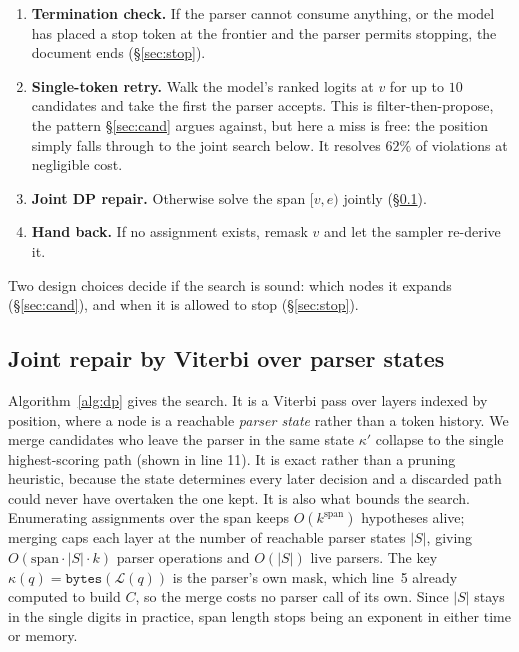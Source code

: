 \documentclass{article}
\begin{document}
\begin{enumerate}[leftmargin=1.4em,itemsep=1pt,topsep=2pt]
\item \textbf{Termination check.} If the parser cannot consume anything, or the
      model has placed a stop token at the frontier and the parser permits
      stopping, the document ends (\S\ref{sec:stop}).
\item \textbf{Single-token retry.} Walk the model's ranked logits at $v$ for up
      to $10$ candidates and take the first the parser accepts. This is
      filter-then-propose, the pattern \S\ref{sec:cand} argues against, but here
      a miss is free: the position simply falls through to the joint search below. It resolves
      $62\%$ of violations at negligible cost.
\item \textbf{Joint DP repair.} Otherwise solve the span $[v,e)$ jointly
      (\S\ref{sec:dp}).
\item \textbf{Hand back.} If no assignment exists, remask $v$ and let the sampler
      re-derive it.
\end{enumerate}

Two design choices decide if the search is sound: which nodes it expands (\S\ref{sec:cand}), and when it is allowed to
stop (\S\ref{sec:stop}).

\subsection{Joint repair by Viterbi over parser states}
\label{sec:dp}

Algorithm~\ref{alg:dp} gives the search. It is a Viterbi pass over layers
indexed by position, where a node is a reachable \emph{parser state} rather than
a token history. We merge candidates who leave the parser in the
same state $\kappa'$ collapse to the single highest-scoring path (shown in line 11). It is exact
rather than a pruning heuristic, because the state determines every later
decision and a discarded path could never have overtaken the one kept. It is
also what bounds the search. Enumerating assignments over the span keeps
$O(k^{\text{span}})$ hypotheses alive; merging caps each layer at the number of
reachable parser states $|S|$, giving $O(\text{span}\cdot|S|\cdot k)$ parser
operations and $O(|S|)$ live parsers. The key
$\kappa(q)=\texttt{bytes}(\mathcal{L}(q))$ is the parser's own mask, which
line~5 already computed to build $C$, so the merge costs no parser call of its
own. Since $|S|$ stays in the single digits in
practice, span length stops being an exponent in either time or memory.
\end{document}
